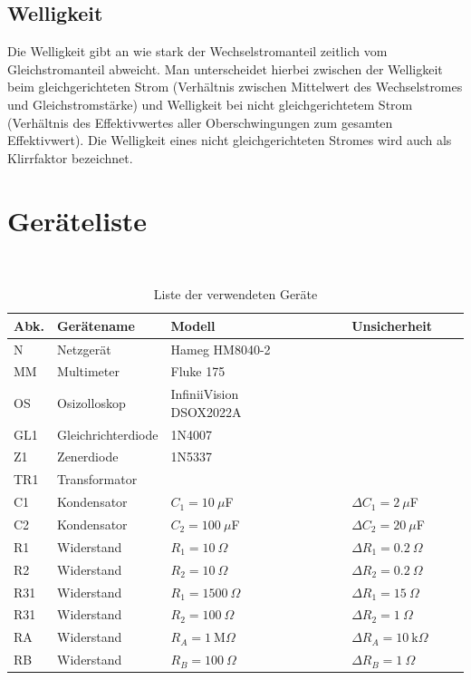 \documentclass{article}
\begin{document}
\subsection{Welligkeit}

Die Welligkeit gibt an wie stark der Wechselstromanteil zeitlich vom Gleichstromanteil abweicht. Man unterscheidet hierbei zwischen der Welligkeit beim gleichgerichteten Strom (Verhältnis zwischen Mittelwert des Wechselstromes und Gleichstromstärke) und Welligkeit bei nicht gleichgerichtetem Strom (Verhältnis des Effektivwertes aller Oberschwingungen zum gesamten Effektivwert). Die Welligkeit eines nicht gleichgerichteten Stromes wird auch als Klirrfaktor bezeichnet.

\section{Geräteliste}

\begin{table}[H]
\caption{Liste der verwendeten Geräte}

~

\begin{tabular}{l|p{2cm}p{3cm}lll}
Abk. & Gerätename    &  Modell  & Unsicherheit\\
\hline
N & Netzgerät & Hameg HM8040-2 \\
MM & Multimeter & Fluke 175 \\
OS & Osizolloskop & InfiniiVision ~~~~~~~~~~~ DSOX2022A \\
GL1 & Gleichrichter\-diode  &  1N4007 \\
Z1 & Zenerdiode  &  1N5337 \\
TR1 & Transformator & \\
C1 & Kondensator & $C_1 = 10~\mu$F & $\Delta C_1 = 2~\mu$F \\
C2 & Kondensator & $C_2 = 100~\mu$F & $\Delta C_2 = 20~\mu$F \\
R1 & Widerstand & $R_1 = 10~\Omega$ & $\Delta R_1 = 0.2~\Omega$ \\
R2 & Widerstand & $R_2 = 10~\Omega$ & $\Delta R_2 = 0.2~\Omega$ \\
R31 & Widerstand & $R_1 = 1500~\Omega$ & $\Delta R_1 = 15~\Omega$ \\
R31 & Widerstand & $R_2 = 100~\Omega$ & $\Delta R_2 = 1~\Omega$ \\
RA & Widerstand & $R_A = 1~$M$\Omega$  & $\Delta R_A = 10~\text{k}\Omega$ \\
RB & Widerstand & $R_B = 100~\Omega$  & $\Delta R_B = 1~\Omega$
\end{tabular}
\end{table}
\end{document}
